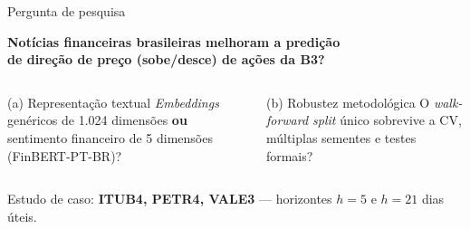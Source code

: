 \documentclass[10pt,aspectratio=169]{beamer}
\begin{document}
\begin{frame}{Pergunta de pesquisa}
  \begin{center}
    \Large\textbf{Notícias financeiras brasileiras melhoram a predição\\de direção de preço (sobe/desce) de ações da B3?}
  \end{center}
  \vspace{2ex}
  \begin{columns}[T]
    \begin{block}{(a) Representação textual}
      \textit{Embeddings} genéricos de 1.024 dimensões \textbf{ou}
      sentimento financeiro de 5 dimensões (FinBERT-PT-BR)?
    \end{block}
    \begin{block}{(b) Robustez metodológica}
      O \textit{walk-forward split} único sobrevive a CV, múltiplas
      sementes e testes formais?
    \end{block}
  \end{columns}
  \vspace{1.5ex}
  \centering
  Estudo de caso: \textbf{ITUB4, PETR4, VALE3} --- horizontes $h=5$ e $h=21$ dias úteis.
\end{frame}
\end{document}
